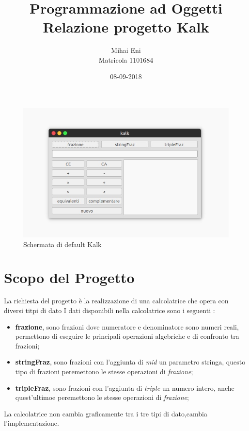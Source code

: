 \documentclass[a4paper,10pt]{article}
\begin{document}
	
	\title{Programmazione ad Oggetti\\Relazione progetto Kalk}
	\author{Mihai Eni\\Matricola 1101684}
	\date{08-09-2018}
    \maketitle
        \begin{figure}[!h]
            \begin{center}
                \includegraphics[scale=0.5]{img/kalk.jpeg}
                \caption{Schermata di default Kalk}
            \end{center}
        \end{figure}    
    
    \newpage
	\tableofcontents
	\newpage
	
    \section{Scopo del Progetto}
    La richiesta del progetto è la realizzazione di una calcolatrice che opera con diversi titpi di dato
    I dati disponibili nella calcolatrice sono i seguenti : 
        \begin{itemize}
            \item \textbf{frazione}, sono frazioni dove numeratore e denominatore sono numeri reali, permettono di eseguire le principali operazioni algebriche e di confronto tra frazioni;
            \item \textbf{stringFraz}, sono frazioni con l'aggiunta di \textit{mid } un parametro stringa, questo tipo di frazioni peremettono le stesse operazioni di \textit{frazione};
            \item \textbf{tripleFraz}, sono frazioni con l'aggiunta di \textit{triple} un numero intero, anche quest'ultimoe peremettono le stesse operazioni di \textit{frazione};
        \end{itemize}
    La calcolatrice non cambia graficamente tra i tre tipi di dato,cambia l'implementazione.
\end{document}
